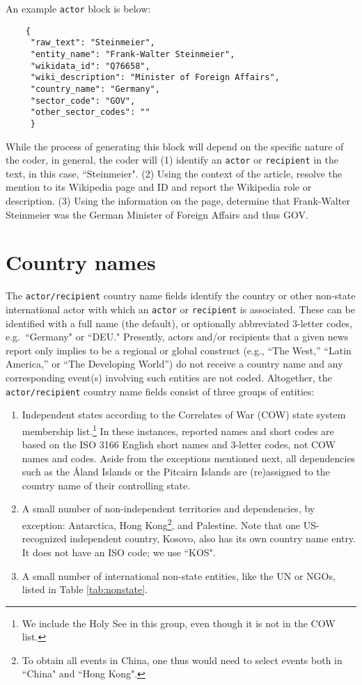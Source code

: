 \documentclass[11pt]{report}
\newcommand{\txt}[1]{\texttt{#1}}
\begin{document}
An example \txt{actor} block is below:

\begin{verbatim}
	{
	 "raw_text": "Steinmeier",
	 "entity_name": "Frank-Walter Steinmeier",
	 "wikidata_id": "Q76658",
	 "wiki_description": "Minister of Foreign Affairs",
	 "country_name": "Germany",
	 "sector_code": "GOV",
	 "other_sector_codes": ""
	 }
\end{verbatim}

While the process of generating this block will depend on the specific nature of the coder, in general, the coder will (1) identify an  \txt{actor} or \txt{recipient} in the text, in this case, ``Steinmeier". (2) Using the context of the article, resolve the mention to its Wikipedia page and ID and report the Wikipedia role or description. (3) Using the information on the page, determine that Frank-Walter Steinmeier was the German Minister of Foreign Affairs and thus GOV.

\section{Country names}

The \texttt{actor/recipient} country name fields identify the country or other non-state international actor with which an \texttt{actor} or \texttt{recipient} is associated. These can be identified with a full name (the default), or optionally abbreviated 3-letter codes, e.g.\ ``Germany" or ``DEU." Presently, actors and/or recipients that a given news report only implies to be a regional or global construct (e.g., ``The West,'' ``Latin America,'' or ``The Developing World'') do not receive a country name and any corresponding event(s) involving such entities are not coded.  Altogether, the \texttt{actor/recipient} country name fields consist of three groups of entities:

\begin{enumerate}
\item Independent states according to the Correlates of War (COW) state system membership list.\footnote{We include the Holy See in this group, even though it is not in the COW list.} In these instances, reported names and short codes are based on the ISO 3166 English short names and 3-letter codes, not COW names and codes. Aside from the exceptions mentioned next, all dependencies such as the \AA land Islands or the Pitcairn Islands are (re)assigned to the country name of their controlling state.
\item A small number of non-independent territories and dependencies, by exception: Antarctica, Hong Kong\footnote{To obtain all events in China, one thus would need to select events both in ``China" and ``Hong Kong".}, and Palestine. Note that one US-recognized independent country, Kosovo, also has its own country name entry. It does not have an ISO code; we use ``KOS".
\item A small number of international non-state entities, like the UN or NGOs, listed in Table \ref{tab:nonstate}.
\end{enumerate}
\end{document}
